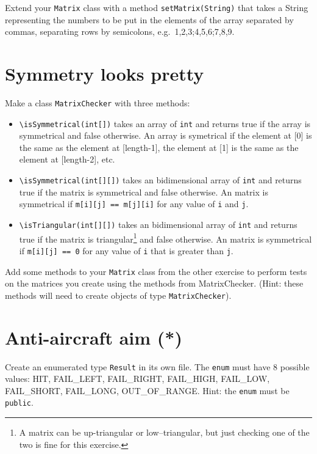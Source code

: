 \documentclass{article}
\begin{document}
Extend your \verb+Matrix+ class with a method \verb+setMatrix(String)+
that takes a String representing the numbers to be put in the elements
of the array separated by commas, separating rows by semicolons,
e.g.~1,2,3;4,5,6;7,8,9. 

\section{Symmetry looks pretty}
\label{sec:symm-looks-pretty}

Make a class \verb+MatrixChecker+ with three methods: 

\begin{itemize}
\item \verb+\isSymmetrical(int[])+ takes an array of \verb+int+ and
  returns true if the array is symmetrical and false otherwise. An
  array is symetrical if the element at [0] is the same as the
  element at [length-1], the element at [1] is the same as the
  element at [length-2], etc.
\item \verb+\isSymmetrical(int[][])+ takes an bidimensional array of
  \verb+int+ and returns true if the matrix is symmetrical and false
  otherwise. An matrix is symmetrical if \verb+m[i][j] == m[j][i]+ for
  any value of \verb+i+ and \verb+j+.
\item \verb+\isTriangular(int[][])+ takes an bidimensional array of
  \verb+int+ and returns true if the matrix is triangular\footnote{A
    matrix can be up-triangular or low--triangular, but just checking
    one of the two is fine for this exercise.} and false
  otherwise. An matrix is symmetrical if \verb+m[i][j] == 0+ for
  any value of \verb+i+ that is greater than \verb+j+.
\end{itemize}

Add some methods to your \verb+Matrix+ class from the other exercise to
perform tests on the matrices you create using the methods from
MatrixChecker. (Hint: these methods will need to create objects of
type \verb+MatrixChecker+). 


\section{Anti-aircraft aim (*)}
\label{sec:anti-aircraft-aim}

Create an enumerated type \verb+Result+ in its own file. The
\verb+enum+ must have 8 possible values: HIT, FAIL\_LEFT, FAIL\_RIGHT,
FAIL\_HIGH, FAIL\_LOW, FAIL\_SHORT, FAIL\_LONG, OUT\_OF\_RANGE. Hint:
the \verb+enum+ must be \verb+public+.
\end{document}
